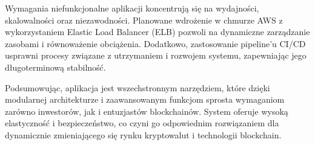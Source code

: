 Wymagania niefunkcjonalne aplikacji koncentrują się na wydajności, skalowalności oraz niezawodności. Planowane wdrożenie w chmurze AWS z wykorzystaniem Elastic Load Balancer (ELB) pozwoli na dynamiczne zarządzanie zasobami i równoważenie obciążenia. Dodatkowo, zastosowanie pipeline’u CI/CD usprawni procesy związane z utrzymaniem i rozwojem systemu, zapewniając jego długoterminową stabilność.

Podsumowując, aplikacja jest wszechstronnym narzędziem, które dzięki modularnej architekturze i zaawansowanym funkcjom sprosta wymaganiom zarówno inwestorów, jak i entuzjastów blockchainów. System oferuje wysoką elastyczność i bezpieczeństwo, co czyni go odpowiednim rozwiązaniem dla dynamicznie zmieniającego się rynku kryptowalut i technologii blockchain.

